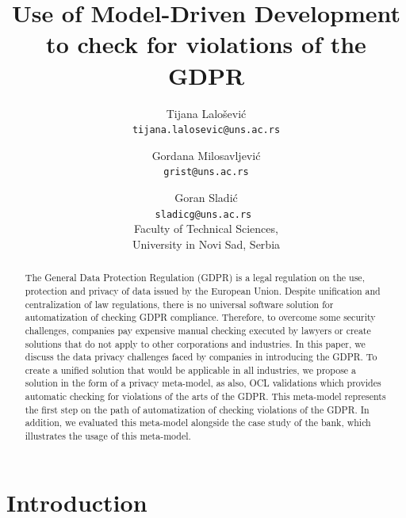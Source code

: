 \documentclass[11pt,english]{article}
\begin{document}
\title{Use of Model-Driven Development to check for violations of the GDPR}
\author{
  Tijana Lalošević\\
  \texttt{tijana.lalosevic@uns.ac.rs}
  \and
  Gordana Milosavljević\\
  \texttt{grist@uns.ac.rs}
  \and
  Goran Sladić\\
  \texttt{sladicg@uns.ac.rs }
  \\Faculty of Technical Sciences,\\ University in Novi Sad, Serbia
}


\date{}
\maketitle


\begin{abstract}
The General Data Protection Regulation (GDPR) is a legal regulation on the use, protection and privacy of data issued by the European Union. Despite unification and centralization of law regulations, there is no universal software solution for automatization of checking GDPR compliance. Therefore, to overcome some security challenges, companies pay expensive manual checking executed by lawyers or create solutions that do not apply to other corporations and industries. In this paper, we discuss the data privacy challenges faced by companies in introducing the GDPR. To create a unified solution that would be applicable in all industries, we propose a solution in the form of a privacy meta-model, as also, OCL validations which provides automatic checking for violations of the arts of the GDPR. This meta-model represents the first step on the path of automatization of checking violations of the GDPR. In addition, we evaluated this meta-model alongside the case study of the bank, which illustrates the usage of this meta-model.
\end{abstract}

\section{Introduction}
\end{document}
